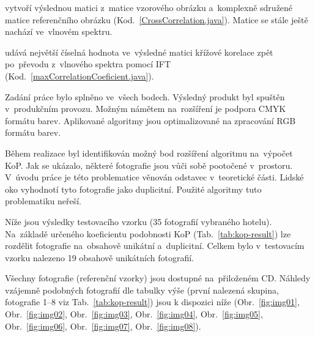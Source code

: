  vytvoří výslednou matici z~matice vzorového obrázku a~komplexně sdružené matice referenčního obrázku (Kod.~\ref{CrossCorrelation.java}). Matice se stále ještě nachází ve~vlnovém spektru.

udává největší číselná hodnota ve~výsledné matici křížové korelace zpět po~převodu z~vlnového spektra pomocí IFT (Kod.~\ref{maxCorrelationCoeficient.java}).


Zadání práce bylo splněno ve~všech bodech. Výsledný produkt byl spuštěn v~produkčním provozu. Možným námětem na~rozšíření je podpora CMYK~\cite{cmyk} formátu barev. Aplikované algoritmy jsou optimalizované na zpracování RGB formátu barev.

Během realizace byl identifikován možný bod rozšíření algoritmu na~výpočet KoP. Jak se ukázalo, některé fotografie jsou vůči sobě pootočené v~prostoru. V~úvodu práce je této problematice věnován odstavec v~teoretické části. Lidské oko vyhodnotí tyto fotografie jako duplicitní. Použité algoritmy tuto problematiku neřeší.

Níže jsou výsledky testovacího vzorku (35 fotografií vybraného hotelu). Na~základě určeného koeficientu podobnosti KoP (Tab.~\ref{tab:kop-result}) lze rozdělit fotografie na~obsahově unikátní a~duplicitní. Celkem bylo v~testovacím vzorku nalezeno 19 obsahově unikátních fotografií.


Všechny fotografie (referenční vzorky) jsou dostupné na~přiloženém CD. Náhledy vzájemně podobných fotografií dle tabulky výše (první nalezená skupina, fotografie 1--8 viz Tab.~\ref{tab:kop-result}) jsou k dispozici níže (Obr.~\ref{fig:img01}, Obr.~\ref{fig:img02}, Obr.~\ref{fig:img03}, Obr.~\ref{fig:img04}, Obr.~\ref{fig:img05}, Obr.~\ref{fig:img06}, Obr.~\ref{fig:img07}, Obr.~\ref{fig:img08}).

